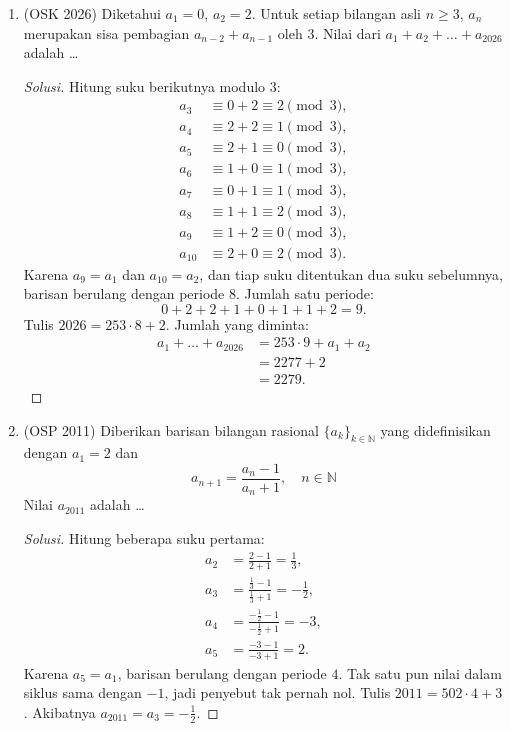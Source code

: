 \documentclass[12pt]{scrartcl}
\begin{document}
\begin{enumerate}[resume]

	\item (OSK 2026)
	Diketahui $a_{1}=0$, $a_{2}=2$. Untuk setiap bilangan asli $n\ge3$, $a_{n}$ merupakan sisa pembagian $a_{n-2}+a_{n-1}$ oleh 3. Nilai dari $a_{1}+a_{2}+\dots+a_{2026}$ adalah \dots
	\begin{proof}[Solusi]
	\renewcommand{\qedsymbol}{$\blacksquare$}
	Hitung suku berikutnya modulo $3$:
	\begin{align*}
	a_3 &\equiv 0 + 2 \equiv 2 \pmod{3}, \\
	a_4 &\equiv 2 + 2 \equiv 1 \pmod{3}, \\
	a_5 &\equiv 2 + 1 \equiv 0 \pmod{3}, \\
	a_6 &\equiv 1 + 0 \equiv 1 \pmod{3}, \\
	a_7 &\equiv 0 + 1 \equiv 1 \pmod{3}, \\
	a_8 &\equiv 1 + 1 \equiv 2 \pmod{3}, \\
	a_9 &\equiv 1 + 2 \equiv 0 \pmod{3}, \\
	a_{10} &\equiv 2 + 0 \equiv 2 \pmod{3}.
	\end{align*}
	Karena $a_9 = a_1$ dan $a_{10} = a_2$, dan tiap suku ditentukan dua suku
	sebelumnya, barisan berulang dengan periode $8$. Jumlah satu periode:
	\[ 0 + 2 + 2 + 1 + 0 + 1 + 1 + 2 = 9. \]
	Tulis $2026 = 253 \cdot 8 + 2$. Jumlah yang diminta:
	\begin{align*}
	a_1 + \dots + a_{2026} &= 253 \cdot 9 + a_1 + a_2 \\
	&= 2277 + 2 \\
	&= 2279.
	\end{align*}
	\end{proof}

	\item (OSP 2011)
	Diberikan barisan bilangan rasional $\{a_k\}_{k \in \mathbb{N}}$ yang didefinisikan dengan $a_1=2$ dan
	\[ a_{n+1}=\frac{a_n-1}{a_n+1}, \quad n \in \mathbb{N} \]
	Nilai $a_{2011}$ adalah \dots
	\begin{proof}[Solusi]
	\renewcommand{\qedsymbol}{$\blacksquare$}
	Hitung beberapa suku pertama:
	\begin{align*}
	a_2 &= \frac{2-1}{2+1} = \frac{1}{3}, \\
	a_3 &= \frac{\frac13-1}{\frac13+1} = -\frac{1}{2}, \\
	a_4 &= \frac{-\frac12-1}{-\frac12+1} = -3, \\
	a_5 &= \frac{-3-1}{-3+1} = 2.
	\end{align*}
	Karena $a_5 = a_1$, barisan berulang dengan periode $4$. Tak satu pun
	nilai dalam siklus sama dengan $-1$, jadi penyebut tak pernah nol.
	Tulis $2011 = 502 \cdot 4 + 3$. Akibatnya $a_{2011} = a_3 = -\frac12$.
	\end{proof}


\end{enumerate}
\end{document}
